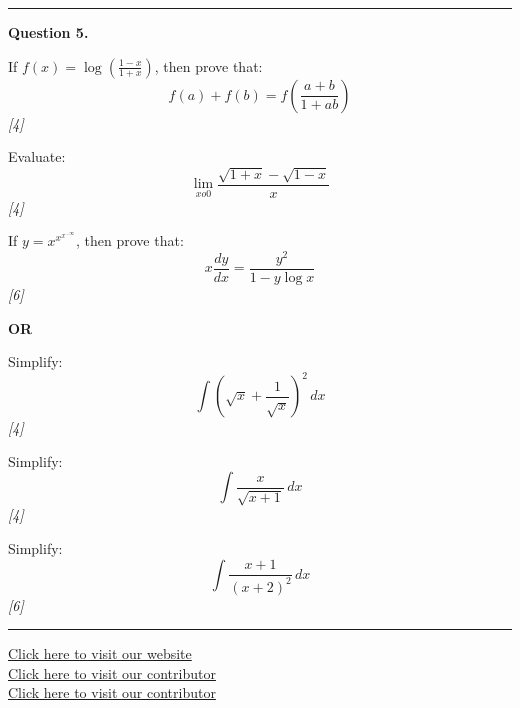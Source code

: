\documentclass[11pt,a4paper]{article}
\newcommand{\pts}[1]{\hfill   \textit{[#1]}}
\begin{document}
\medskip\rule{\linewidth}{0.2pt}

\pagebreak




\noindent   \textbf{Question 5.}

\begin{parts}
  \item If $f(x) = \log\left(\frac{1-x}{1+x}\right)$, then prove that:
  \[
  f(a) + f(b) = f\left(\frac{a+b}{1+ab}\right)
  \]\pts{4}
  \item Evaluate:
  \[
  \lim_{x  o 0} \frac{\sqrt{1+x} - \sqrt{1-x}}{x}
  \]\pts{4}
  \item If $y = x^{x^{x^{\dots \infty}}}$, then prove that:
  \[
  x \frac{dy}{dx} = \frac{y^2}{1 - y\log x}
  \]\pts{6}
\end{parts}

\centerline{   \textbf{OR}}


\begin{parts}
  \item Simplify:
  \[
  \int \left(\sqrt{x} + \frac{1}{\sqrt{x}}\right)^2 \, dx
  \]\pts{4}
  \item Simplify:
  \[
  \int \frac{x}{\sqrt{x+1}} \, dx
  \]\pts{4}
  \item Simplify:
  \[
  \int \frac{x+1}{(x+2)^2} \, dx
  \]\pts{6}
\end{parts}

\vfill
\rule{\linewidth}{0.4pt}

\begin{center}\small
\href{https://bhu-exam.vercel.app/}{Click here to visit our website}\\[4pt]
\href{https://me-aryan.vercel.app/}{Click here to visit our contributor}\\[4pt]
\href{https://quashan-me.vercel.app/}{Click here to visit our contributor}
\end{center}
\end{document}
